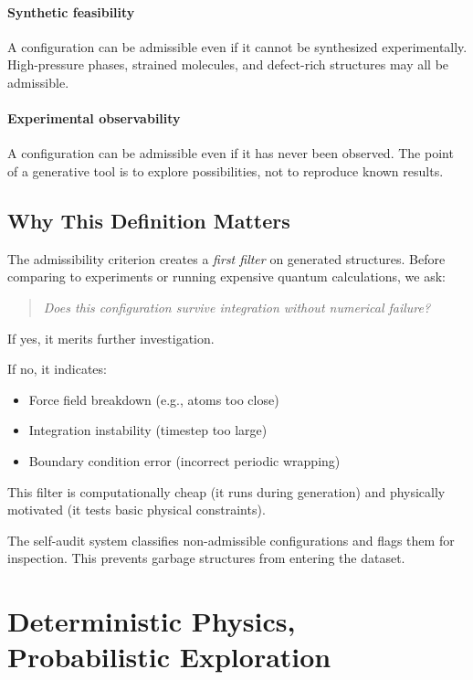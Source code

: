 \documentclass[11pt]{article}
\begin{document}
\paragraph{Synthetic feasibility} A configuration can be admissible even if it cannot be synthesized experimentally. High-pressure phases, strained molecules, and defect-rich structures may all be admissible.

\paragraph{Experimental observability} A configuration can be admissible even if it has never been observed. The point of a generative tool is to explore possibilities, not to reproduce known results.

\subsection{Why This Definition Matters}

The admissibility criterion creates a \textit{first filter} on generated structures. Before comparing to experiments or running expensive quantum calculations, we ask:

\begin{quote}
\textit{Does this configuration survive integration without numerical failure?}
\end{quote}

If yes, it merits further investigation.

If no, it indicates:
\begin{itemize}
\item Force field breakdown (e.g., atoms too close)
\item Integration instability (timestep too large)
\item Boundary condition error (incorrect periodic wrapping)
\end{itemize}

This filter is computationally cheap (it runs during generation) and physically motivated (it tests basic physical constraints).

The self-audit system classifies non-admissible configurations and flags them for inspection. This prevents garbage structures from entering the dataset.

\section{Deterministic Physics, Probabilistic Exploration}
\end{document}

